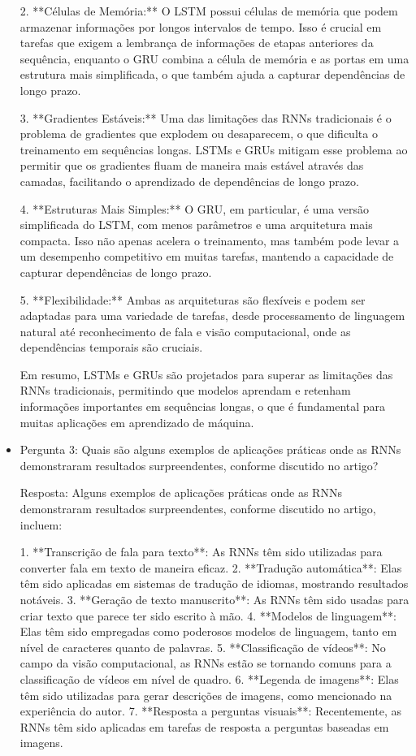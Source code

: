 \documentclass[12 pt]{article}
\begin{document}
\begin{itemize}
    2. **Células de Memória:** O LSTM possui células de memória que podem armazenar informações 
    por longos intervalos de tempo. Isso é crucial em tarefas que exigem a lembrança de informações de etapas anteriores da sequência, enquanto o GRU combina a célula de memória e as portas em uma estrutura mais simplificada, o que também ajuda a capturar dependências de longo prazo.
    
    3. **Gradientes Estáveis:** Uma das limitações das RNNs tradicionais é o problema de gradientes que explodem ou desaparecem, o que dificulta o treinamento em sequências longas. LSTMs e GRUs mitigam esse problema ao permitir que os gradientes fluam de maneira mais estável através das camadas, facilitando o aprendizado de dependências de longo prazo.
    
    4. **Estruturas Mais Simples:** O GRU, em particular, é uma versão simplificada do LSTM, com menos parâmetros e uma arquitetura mais compacta. Isso não apenas acelera o treinamento, mas também pode levar a um desempenho competitivo em muitas tarefas, mantendo a capacidade de 
    capturar dependências de longo prazo.
    
    5. **Flexibilidade:** Ambas as arquiteturas são flexíveis e podem ser adaptadas para uma variedade de tarefas, desde processamento de linguagem natural até reconhecimento de fala e visão computacional, onde as dependências temporais são cruciais.
    
    Em resumo, LSTMs e GRUs são projetados para superar as limitações das RNNs tradicionais, permitindo que modelos aprendam e retenham informações importantes em sequências longas, o que 
    é fundamental para muitas aplicações em aprendizado de máquina.

    \item Pergunta 3: Quais são alguns exemplos de aplicações práticas onde as RNNs demonstraram resultados surpreendentes, conforme discutido no artigo?

    Resposta: Alguns exemplos de aplicações práticas onde as RNNs demonstraram resultados surpreendentes, conforme discutido no artigo, incluem:

    1. **Transcrição de fala para texto**: As RNNs têm sido utilizadas para converter fala em texto de maneira eficaz.
    2. **Tradução automática**: Elas têm sido aplicadas em sistemas de tradução de idiomas, mostrando resultados notáveis.
    3. **Geração de texto manuscrito**: As RNNs têm sido usadas para criar texto que parece ter 
    sido escrito à mão.
    4. **Modelos de linguagem**: Elas têm sido empregadas como poderosos modelos de linguagem, tanto em nível de caracteres quanto de palavras.
    5. **Classificação de vídeos**: No campo da visão computacional, as RNNs estão se tornando comuns para a classificação de vídeos em nível de quadro.
    6. **Legenda de imagens**: Elas têm sido utilizadas para gerar descrições de imagens, como mencionado na experiência do autor.
    7. **Resposta a perguntas visuais**: Recentemente, as RNNs têm sido aplicadas em tarefas de 
    resposta a perguntas baseadas em imagens.


\end{itemize}
\end{document}
